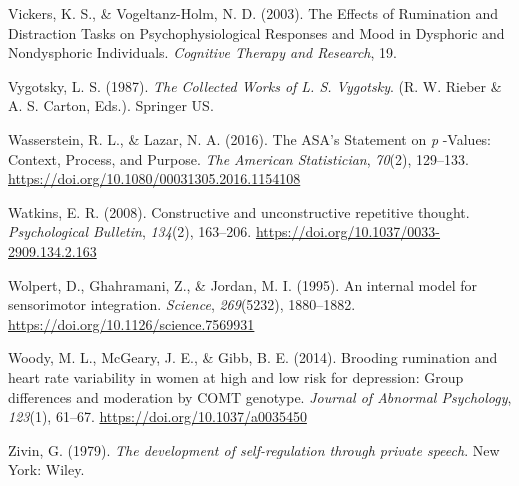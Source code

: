 \documentclass[a4paper,12pt,twoside,openright,oldfontcommands]{memoir}
\begin{document}
\hypertarget{ref-vickers_effects_2003}{}
Vickers, K. S., \& Vogeltanz-Holm, N. D. (2003). The Effects of
Rumination and Distraction Tasks on Psychophysiological Responses and
Mood in Dysphoric and Nondysphoric Individuals. \emph{Cognitive Therapy
and Research}, 19.

\hypertarget{ref-vygotsky_collected_1987}{}
Vygotsky, L. S. (1987). \emph{The Collected Works of L. S. Vygotsky}.
(R. W. Rieber \& A. S. Carton, Eds.). Springer US.

\hypertarget{ref-wasserstein_asas_2016}{}
Wasserstein, R. L., \& Lazar, N. A. (2016). The ASA's Statement on
\emph{p} -Values: Context, Process, and Purpose. \emph{The American
Statistician}, \emph{70}(2), 129--133.
\url{https://doi.org/10.1080/00031305.2016.1154108}

\hypertarget{ref-Watkins2008}{}
Watkins, E. R. (2008). Constructive and unconstructive repetitive
thought. \emph{Psychological Bulletin}, \emph{134}(2), 163--206.
\url{https://doi.org/10.1037/0033-2909.134.2.163}

\hypertarget{ref-wolpert_internal_1995}{}
Wolpert, D., Ghahramani, Z., \& Jordan, M. I. (1995). An internal model
for sensorimotor integration. \emph{Science}, \emph{269}(5232),
1880--1882. \url{https://doi.org/10.1126/science.7569931}

\hypertarget{ref-woody_brooding_2014}{}
Woody, M. L., McGeary, J. E., \& Gibb, B. E. (2014). Brooding rumination
and heart rate variability in women at high and low risk for depression:
Group differences and moderation by COMT genotype. \emph{Journal of
Abnormal Psychology}, \emph{123}(1), 61--67.
\url{https://doi.org/10.1037/a0035450}

\hypertarget{ref-zivin_development_1979}{}
Zivin, G. (1979). \emph{The development of self-regulation through
private speech}. New York: Wiley.
\end{document}
